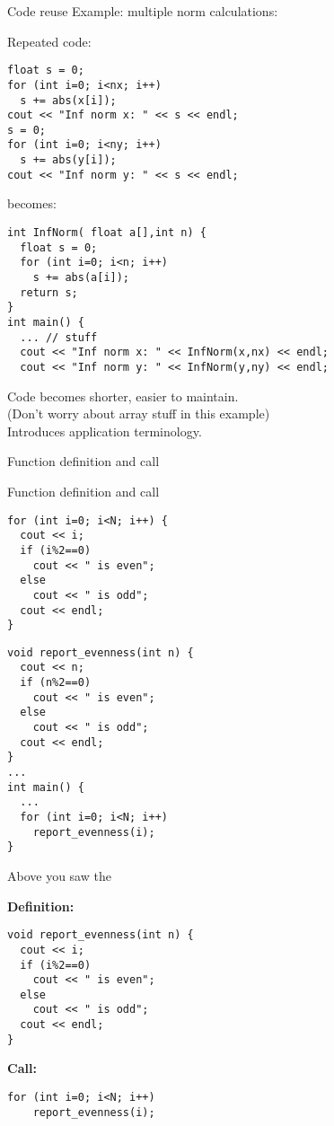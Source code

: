 \begin{block}{Code reuse}
  \label{sl:function-reuse}
Example: multiple norm calculations:
  \begin{multicols}{2}
    \small
    Repeated code:
\begin{verbatim}
float s = 0;
for (int i=0; i<nx; i++)
  s += abs(x[i]);
cout << "Inf norm x: " << s << endl;
s = 0;
for (int i=0; i<ny; i++)
  s += abs(y[i]);
cout << "Inf norm y: " << s << endl;
\end{verbatim}
\vfill\columnbreak
becomes:
\begin{verbatim}
int InfNorm( float a[],int n) {
  float s = 0;
  for (int i=0; i<n; i++)
    s += abs(a[i]);
  return s;
}
int main() {
  ... // stuff
  cout << "Inf norm x: " << InfNorm(x,nx) << endl;
  cout << "Inf norm y: " << InfNorm(y,ny) << endl;
\end{verbatim}
  \end{multicols}
  Code becomes shorter, easier to maintain.\\
  (Don't worry about array stuff in this example)\\
  Introduces application terminology.
\end{block}

 {Function definition and call}

\begin{slide}{Function definition and call}
  \label{sl:def-call}
  \begin{multicols}{2}
\begin{verbatim}
for (int i=0; i<N; i++) {
  cout << i;
  if (i%2==0)
    cout << " is even";
  else
    cout << " is odd";
  cout << endl;
}
\end{verbatim}
\columnbreak
\begin{verbatim}
void report_evenness(int n) {
  cout << n;
  if (n%2==0)
    cout << " is even";
  else
    cout << " is odd";
  cout << endl;
}
...
int main() {
  ...
  for (int i=0; i<N; i++)
    report_evenness(i);
}
\end{verbatim}
  \end{multicols}
\end{slide}

Above you saw the 

\begin{multicols}{2}
  \textbf{Definition:}
\begin{verbatim}
void report_evenness(int n) {
  cout << i;
  if (i%2==0)
    cout << " is even";
  else
    cout << " is odd";
  cout << endl;
}
\end{verbatim}
\columnbreak
\textbf{Call:}
\begin{verbatim}
for (int i=0; i<N; i++)
    report_evenness(i);
\end{verbatim}
\end{multicols}

